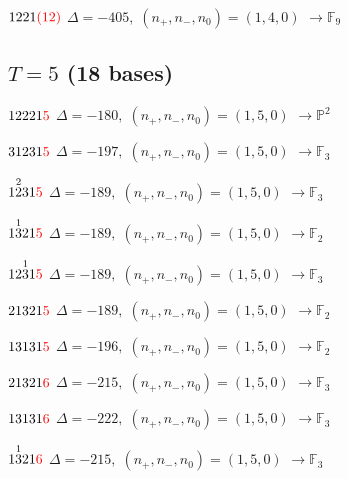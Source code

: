 \documentclass[10pt]{article}
\begin{document}
$1221\textcolor{red}{(12)}$ \quad $\Delta=-405,\; (n_+,n_-,n_0)=(1,4,0)$ \quad $\to \mathbb{F}_{9}$


\subsection*{$T = 5$ \quad (18 bases)}
\smallskip

$12221\textcolor{red}{5}$ \quad $\Delta=-180,\; (n_+,n_-,n_0)=(1,5,0)$ \quad $\to \mathbb{P}^2$

\smallskip

$31231\textcolor{red}{5}$ \quad $\Delta=-197,\; (n_+,n_-,n_0)=(1,5,0)$ \quad $\to \mathbb{F}_{3}$

\smallskip

$1\overset{2}{2}31\textcolor{red}{5}$ \quad $\Delta=-189,\; (n_+,n_-,n_0)=(1,5,0)$ \quad $\to \mathbb{F}_{3}$

\smallskip

$1\overset{1}{3}21\textcolor{red}{5}$ \quad $\Delta=-189,\; (n_+,n_-,n_0)=(1,5,0)$ \quad $\to \mathbb{F}_{2}$

$12\overset{1}{3}1\textcolor{red}{5}$ \quad $\Delta=-189,\; (n_+,n_-,n_0)=(1,5,0)$ \quad $\to \mathbb{F}_{3}$

\smallskip

$21321\textcolor{red}{5}$ \quad $\Delta=-189,\; (n_+,n_-,n_0)=(1,5,0)$ \quad $\to \mathbb{F}_{2}$

\smallskip

$13131\textcolor{red}{5}$ \quad $\Delta=-196,\; (n_+,n_-,n_0)=(1,5,0)$ \quad $\to \mathbb{F}_{2}$

\smallskip

$21321\textcolor{red}{6}$ \quad $\Delta=-215,\; (n_+,n_-,n_0)=(1,5,0)$ \quad $\to \mathbb{F}_{3}$

\smallskip

$13131\textcolor{red}{6}$ \quad $\Delta=-222,\; (n_+,n_-,n_0)=(1,5,0)$ \quad $\to \mathbb{F}_{3}$

\smallskip

$1\overset{1}{3}21\textcolor{red}{6}$ \quad $\Delta=-215,\; (n_+,n_-,n_0)=(1,5,0)$ \quad $\to \mathbb{F}_{3}$
\end{document}

